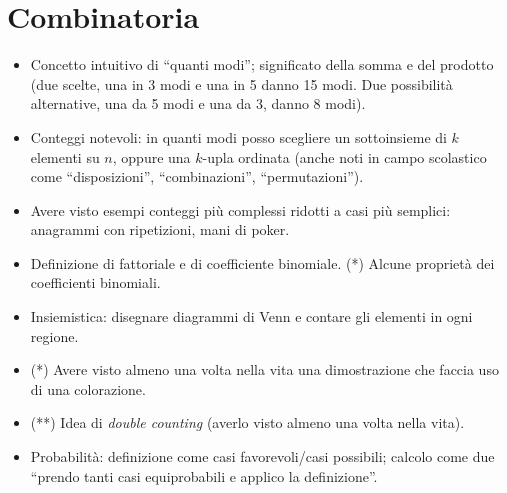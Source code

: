\documentclass[a4paper,10pt]{paper}
\renewcommand{\star}{(*)}
\newcommand{\sstar}{(**)}
\begin{document}
\section{Combinatoria}
\begin{itemize}
 \item Concetto intuitivo di ``quanti modi''; significato della somma e del prodotto (due scelte, una in 3 modi e una in 5 danno 15 modi. Due possibilità alternative, una da 5 modi e una da 3, danno 8 modi).
 \item Conteggi notevoli: in quanti modi posso scegliere un sottoinsieme di $k$ elementi su $n$, oppure una $k$-upla ordinata (anche noti in campo scolastico come ``disposizioni'', ``combinazioni'', ``permutazioni'').
 \item Avere visto esempi conteggi più complessi ridotti a casi più semplici: anagrammi con ripetizioni, mani di poker.
 \item Definizione di fattoriale e di coefficiente binomiale. \star{} Alcune proprietà dei coefficienti binomiali.
 \item Insiemistica: disegnare diagrammi di Venn e contare gli elementi in ogni regione.
 \item \star{} Avere visto almeno una volta nella vita una dimostrazione che faccia uso di una colorazione.
 \item \sstar{} Idea di \emph{double counting} (averlo visto almeno una volta nella vita).
 \item Probabilità: definizione come casi favorevoli/casi possibili; calcolo come due ``prendo tanti casi equiprobabili e applico la definizione''.
\end{itemize}
\end{document}
